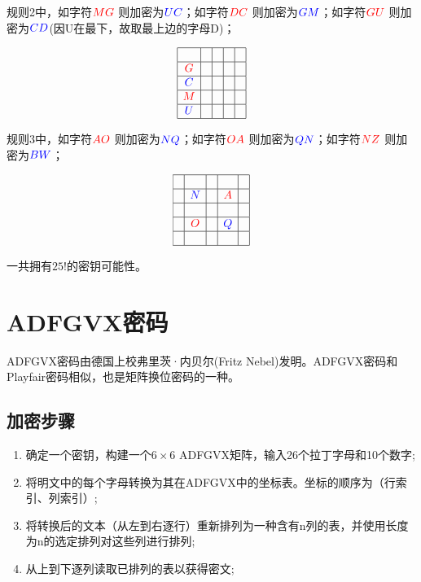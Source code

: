\documentclass{article}
\begin{document}
 
规则2中，如字符${\color{red}MG}$ 则加密为${\color{blue}UC}$；如字符${\color{red}DC}$ 则加密为${\color{blue}GM}$；如字符${\color{red}GU}$ 则加密为${\color{blue}CD}$(因U在最下，故取最上边的字母D)；

$$
\begin{array}{|c|c|c|c|c|}
\hline &  & &   &   \\
\hline {\color{red}G}&  & &   &   \\
\hline {\color{blue}C}&  & &   &   \\
\hline {\color{red}M}&  & &   &   \\
\hline {\color{blue}U}&  & &   &   \\
\hline
\end{array}
$$

规则3中，如字符${\color{red}AO}$ 则加密为${\color{blue}NQ}$；如字符${\color{red}OA}$ 则加密为${\color{blue}QN }$；如字符${\color{red}NZ}$ 则加密为${\color{blue}BW}$；
 
$$
\begin{array}{|c|c|c|c|c|}
\hline  &  & &   &   \\
\hline  & {\color{blue}N} & & {\color{red}A}  & \\
\hline  &  & &   &  \\
\hline  & {\color{red}O} & &  {\color{blue}Q} &  \\
\hline  &  & &   &  \\
\hline
\end{array}
$$


一共拥有$25!$的密钥可能性。


\section{ADFGVX密码}
ADFGVX密码由德国上校弗里茨·内贝尔(Fritz Nebel)发明。ADFGVX密码和Playfair密码相似，也是矩阵换位密码的一种。

\subsection{加密步骤}
\begin{enumerate}
\item 确定一个密钥，构建一个$6 \times 6$ ADFGVX矩阵，输入26个拉丁字母和10个数字;
\item 将明文中的每个字母转换为其在ADFGVX中的坐标表。坐标的顺序为（行索引、列索引）;
\item 将转换后的文本（从左到右逐行）重新排列为一种含有n列的表，并使用长度为n的选定排列对这些列进行排列;
\item 从上到下逐列读取已排列的表以获得密文;
\end{enumerate}
\end{document}
